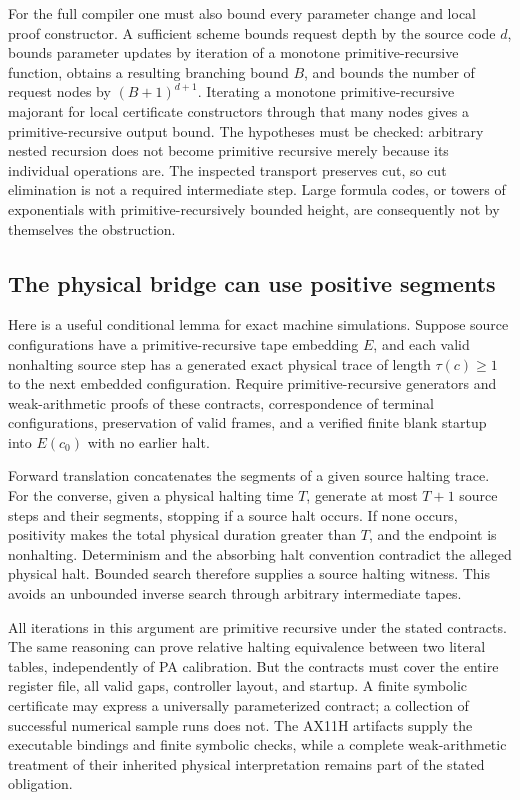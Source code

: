 For the full compiler one must also bound every parameter change and
local proof constructor.  A sufficient scheme bounds request depth by
the source code $d$, bounds parameter updates by iteration of a monotone
primitive-recursive function, obtains a resulting branching bound $B$,
and bounds the number of request nodes by $(B+1)^{d+1}$.  Iterating a
monotone primitive-recursive majorant for local certificate constructors
through that many nodes gives a primitive-recursive output bound.  The
hypotheses must be checked: arbitrary nested recursion does not become
primitive recursive merely because its individual operations are.
The inspected transport preserves cut, so cut elimination is not a
required intermediate step.  Large formula codes, or towers of
exponentials with primitive-recursively bounded height, are consequently
not by themselves the obstruction.\cite{fullpa-audit}

\subsection{The physical bridge can use positive segments}
\label{ipra-physical}

Here is a useful conditional lemma for exact machine simulations.
Suppose source configurations have a primitive-recursive tape embedding
$E$, and each valid nonhalting source step has a generated exact physical
trace of length $\tau(c)\ge1$ to the next embedded configuration.
Require primitive-recursive generators and weak-arithmetic proofs of
these contracts, correspondence of terminal configurations, preservation
of valid frames, and a verified finite blank startup into $E(c_0)$ with
no earlier halt.

Forward translation concatenates the segments of a given source halting
trace.  For the converse, given a physical halting time $T$, generate at
most $T+1$ source steps and their segments, stopping if a source halt
occurs.  If none occurs, positivity makes the total physical duration
greater than $T$, and the endpoint is nonhalting.  Determinism and the
absorbing halt convention contradict the alleged physical halt.  Bounded
search therefore supplies a source halting witness.  This avoids an
unbounded inverse search through arbitrary intermediate tapes.

All iterations in this argument are primitive recursive under the stated
contracts.  The same reasoning can prove relative halting equivalence
between two literal tables, independently of PA calibration.  But the
contracts must cover the entire register file, all valid gaps, controller
layout, and startup.  A finite symbolic certificate may express a
universally parameterized contract; a collection of successful numerical
sample runs does not.  The AX11H artifacts supply the executable bindings
and finite symbolic checks, while a complete weak-arithmetic treatment of
their inherited physical interpretation remains part of the stated
obligation.\cite{pa-readme}


